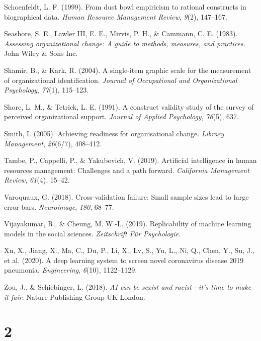 \documentclass[
  man]{apa7}
\newlength{\cslhangindent}
\newenvironment{CSLReferences}[2] %
 {\begin{list}{}{%
  \setlength{\itemindent}{0pt}
  \setlength{\leftmargin}{0pt}
  \setlength{\parsep}{0pt}
  \ifodd #1
   \setlength{\leftmargin}{\cslhangindent}
   \setlength{\itemindent}{-1\cslhangindent}
  \fi
  \setlength{\itemsep}{#2\baselineskip}}}
 {\end{list}}
\begin{document}
\begin{CSLReferences}{1}{0}
Schoenfeldt, L. F. (1999). From dust bowl empiricism to rational constructs in biographical data. \emph{Human Resource Management Review}, \emph{9}(2), 147--167.

Seashore, S. E., Lawler III, E. E., Mirvis, P. H., \& Cammann, C. E. (1983). \emph{Assessing organizational change: A guide to methods, measures, and practices.} John Wiley \& Sons Inc.

Shamir, B., \& Kark, R. (2004). A single-item graphic scale for the measurement of organizational identification. \emph{Journal of Occupational and Organizational Psychology}, \emph{77}(1), 115--123.

Shore, L. M., \& Tetrick, L. E. (1991). A construct validity study of the survey of perceived organizational support. \emph{Journal of Applied Psychology}, \emph{76}(5), 637.

Smith, I. (2005). Achieving readiness for organisational change. \emph{Library Management}, \emph{26}(6/7), 408--412.

Tambe, P., Cappelli, P., \& Yakubovich, V. (2019). Artificial intelligence in human resources management: Challenges and a path forward. \emph{California Management Review}, \emph{61}(4), 15--42.

Varoquaux, G. (2018). Cross-validation failure: Small sample sizes lead to large error bars. \emph{Neuroimage}, \emph{180}, 68--77.

Vijayakumar, R., \& Cheung, M. W.-L. (2019). Replicability of machine learning models in the social sciences. \emph{Zeitschrift F{ü}r Psychologie}.

Xu, X., Jiang, X., Ma, C., Du, P., Li, X., Lv, S., Yu, L., Ni, Q., Chen, Y., Su, J., et al. (2020). A deep learning system to screen novel coronavirus disease 2019 pneumonia. \emph{Engineering}, \emph{6}(10), 1122--1129.

Zou, J., \& Schiebinger, L. (2018). \emph{AI can be sexist and racist---it's time to make it fair}. Nature Publishing Group UK London.

\end{CSLReferences}

\newpage

\appendix

\section{2}\label{aptables}


\clearpage
\renewcommand{\listfigurename}{Figure captions}

\clearpage
\renewcommand{\listtablename}{Table captions}
\end{document}
